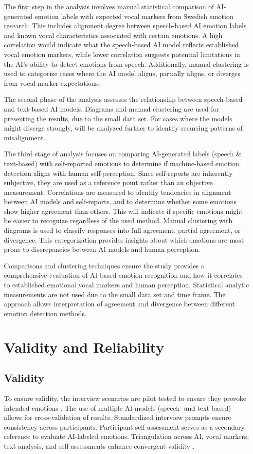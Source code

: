 The first step in the analysis involves manual statistical comparison of AI-generated emotion labels with expected vocal markers from Swedish emotion research. This includes alignment degree between speech-based AI emotion labels and known vocal characteristics associated with certain emotions. A high correlation would indicate what the speech-based AI model reflects established vocal emotion markers, while lower correlation suggests potential limitations in the AI’s ability to detect emotions from speech. Additionally, manual clustering is used to categorize cases where the AI model aligns, partially aligns, or diverges from vocal marker expectations.  

The second phase of the analysis assesses the relationship between speech-based and text-based AI models. Diagrams and manual clustering are used for presenting the results, due to the small data set. For cases where the models might diverge strongly, will be analyzed further to identify recurring patterns of misalignment. 

The third stage of analysis focuses on comparing AI-generated labels (speech \& text-based) with self-reported emotions to determine if machine-based emotion detection aligns with human self-perception. Since self-reports are inherently subjective, they are used as a reference point rather than an objective measurement. Correlations are measured to identify tendencies in alignment between AI models and 
self-reports, and to determine whether some emotions show higher agreement than others. 
This will indicate if specific emotions might be easier to recognize regardless of the used method. Manual clustering with diagrams is used to classify responses into full agreement, partial agreement, or divergence. This categorization provides insights about which emotions are most prone to discrepancies between AI models and human perception. 

Comparisons and clustering techniques ensure the study provides a comprehensive evaluation of AI-based emotion recognition and how it correlates to established emotional vocal markers and human perception. Statistical analytic measurements are not used due to the small data set and time frame. The approach allows interpretation of agreement and divergence between different emotion detection methods. 

\section{Validity and Reliability}
\subsection{Validity}
To ensure validity, the interview scenarios are pilot tested to ensure they provoke intended emotions \autocite{Bryman2022}. The use of multiple AI models (speech- and text-based) allows for cross-validation of results. Standardized interview prompts ensure consistency across participants. Participant self-assessment serves as a secondary reference to evaluate AI-labeled emotions. Triangulation across AI, vocal markers, text analysis, and self-assessments enhance convergent validity \autocite{Creswell2023}. 

